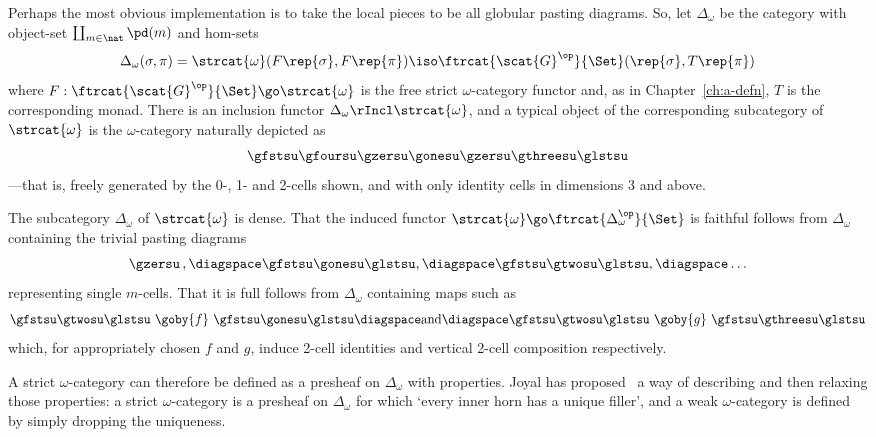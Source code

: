 %
%
%
%
%


Perhaps the most obvious implementation is to take the local pieces to be
all globular%
%
%
pasting diagrams.  So, let $\Delta_\omega$%
% 
%
%
% 
be the category
with object-set $\coprod_{m\in\nat} \pd(m)$ and hom-sets
\[
\Delta_\omega (\sigma, \pi)
=
\strcat{\omega}(F\rep{\sigma}, F\rep{\pi})
\iso
\ftrcat{\scat{G}^\op}{\Set} (\rep{\sigma}, T\rep{\pi})
\]
where $F: \ftrcat{\scat{G}^\op}{\Set} \go \strcat{\omega}$ is the free
strict $\omega$-category functor and, as in Chapter~\ref{ch:a-defn}, $T$ is
the corresponding monad.  There is an inclusion functor $\Delta_\omega
\rIncl \strcat{\omega}$, and a typical object of the corresponding
subcategory of $\strcat{\omega}$ is the $\omega$-category naturally
depicted as
\[
\gfstsu\gfoursu\gzersu\gonesu\gzersu\gthreesu\glstsu
\]
---that is, freely generated by the 0-, 1- and 2-cells shown, and with only
identity cells in dimensions 3 and above.  

The subcategory $\Delta_\omega$ of $\strcat{\omega}$ is dense.  That the
induced functor $\strcat{\omega} \go \ftrcat{\Delta_\omega^\op}{\Set}$ is
faithful follows from $\Delta_\omega$ containing the trivial pasting
diagrams
\[
\gzersu\,,
\diagspace
\gfstsu\gonesu\glstsu,
\diagspace
\gfstsu\gtwosu\glstsu,
\diagspace
\ldots
\]
representing single $m$-cells.  That it is full follows from
$\Delta_\omega$ containing maps such as 
% 
\begin{equation}	\label{eq:comp-inducers}
\gfstsu\gtwosu\glstsu
\ \goby{f}\ 
\gfstsu\gonesu\glstsu
\diagspace
\textrm{and}
\diagspace
\gfstsu\gtwosu\glstsu
\ \goby{g}\ 
\gfstsu\gthreesu\glstsu
\end{equation}
% 
which, for appropriately chosen $f$ and $g$, induce 2-cell identities and
vertical 2-cell composition respectively.

A strict $\omega$-category can therefore be defined as a presheaf on
$\Delta_\omega$ with properties.  Joyal has proposed~\cite{JoyDDT} a way of
describing and then relaxing those properties: a strict $\omega$-category
is a presheaf on $\Delta_\omega$ for which `every inner horn%
%
%
has a unique
filler',
and a weak $\omega$-category is defined by simply dropping the
uniqueness.

